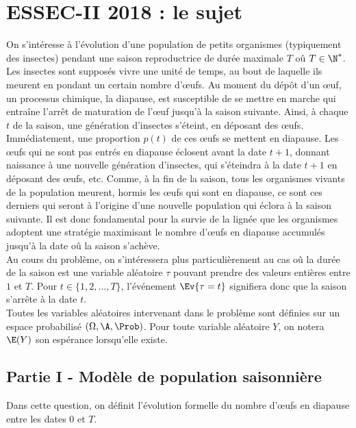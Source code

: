 \chapter*{ESSEC-II 2018 : le sujet}
  
%

\noindent
On s'intéresse à l'évolution d'une population de petits organismes 
(typiquement des insectes) pendant une \og saison \fg{} reproductrice 
de durée maximale $T$ oû $T \in \N^*$. Les insectes sont supposés vivre 
une unité de temps, au bout de laquelle ils meurent en pondant un 
certain nombre d'{\oe}ufs. Au moment du dépôt d'un {\oe}uf, un 
processus chimique, la diapause, est susceptible de se mettre en marche 
qui entraîne l'arrêt de maturation de l'{\oe}uf jusqu'à la saison 
suivante. Ainsi, à chaque $t$ de la saison, une génération d'insectes 
s'éteint, en déposant des {\oe}ufs. Immédiatement, une proportion 
$p(t)$ de ces {\oe}ufs se mettent en diapause. Les {\oe}ufs qui ne sont 
pas entrés en diapause éclosent avant la date $t+1$, donnant naissance 
à une nouvelle génération d'insectes, qui s'éteindra à la date $t+1$ en 
déposant des {\oe}ufs, etc. Comme, à la fin de la saison, tous les 
organismes vivants de la population meurent, hormis les {\oe}ufs qui 
sont en diapause, ce sont ces derniers qui seront à l'origine d'une 
nouvelle population qui éclora à la saison suivante. Il est donc 
fondamental pour la survie de la lignée que les organismes adoptent une 
stratégie maximisant le nombre d'{\oe}ufs en diapause accumulés jusqu'à 
la date oû la saison s'achève.\\[.1cm]
Au cours du problème, on s'intéressera plus particulièrement au cas oû 
la durée de la saison est une variable aléatoire $\tau$ pouvant prendre 
des valeurs entières entre $1$ et $T$. Pour $t\in \{1,2, \ldots, T\}$, 
l'événement $\Ev{\tau=t}$ signifiera donc que la saison s'arrête à la 
date $t$.\\[.1cm]
Toutes les variables aléatoires intervenant dans le problème sont 
définies sur un espace probabilisé $(\Omega, \A, \Prob)$. Pour toute 
variable aléatoire $Y$, on notera $\E(Y)$ son espérance lorsqu'elle 
existe.



\section*{Partie I - Modèle de population saisonnière}

\noindent
\begin{minipage}{20cm}
  Dans cette question, on définit l'évolution formelle du nombre 
  d'{\oe}ufs en diapause entre les dates $0$ et $T$.
\end{minipage}


